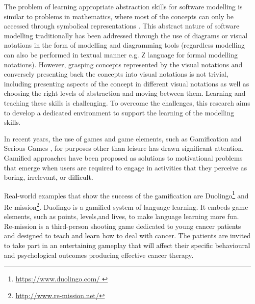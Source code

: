\documentclass[10pt, a4paper]{report} \usepackage[titletoc]{appendix}
\begin{document}
The problem of learning appropriate abstraction skills for software modelling is similar to problems in mathematics, where most of the concepts can only be accessed through symbolical representations \cite{Duval2006}. This abstract nature of software modelling traditionally has been addressed through the use of diagrams or visual notations in the form of modelling and diagramming tools (regardless  modelling can also be performed in textual manner e.g. Z language for formal modelling notations). However, grasping concepts represented by the visual notations and conversely presenting back the concepts into visual notations is not trivial, including presenting aspects of the concept in different visual notations as well as choosing the right levels of abstraction and moving between them. Learning and teaching these skills is challenging. To overcome the challenges, this research aims to develop a dedicated environment to support the learning of the modelling skills. 
 
In recent years, the use of games and game elements, such as Gamification \cite{deterding2011game} and Serious Games \cite{Michael2005}, for purposes other than leisure has drawn significant attention. Gamified approaches have been proposed as solutions to motivational problems that emerge when users are required to engage in activities that they perceive as boring, irrelevant, or difficult. 

Real-world examples that show the success of the gamification are Duolingo\footnote{\url{https://www.duolingo.com/ }} and Re-mission\footnote{\url{http://www.re-mission.net/}}. Duolingo is a gamified system of language learning. It embeds game elements, such as points, levels,and lives, to make language learning more fun. Re-mission is a third-person shooting game dedicated to young cancer patients and designed to teach and learn how to deal with cancer. The patients are invited to take part in an entertaining gameplay that will affect their specific behavioural and psychological outcomes producing effective cancer therapy.
 
\end{document}
